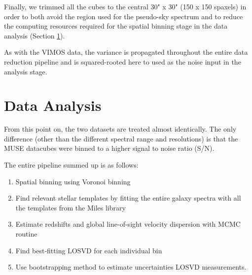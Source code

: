 		Finally, we trimmed all the cubes to the central 30" x 30" (150 x 150 spaxels) in order to both avoid the region used for the pseudo-sky spectrum and to reduce the computing resources required for the spatial binning stage in the data analysis (Section \ref{sec:analysis}). 

		As with the VIMOS data, the variance is propagated throughout the entire data reduction pipeline and is squared-rooted here to used as the noise input in the analysis stage. 
\section{Data Analysis}
	\label{sec:analysis}
	From this point on, the two datasets are treated almost identically. The only difference (other than the different spectral range and resolutions) is that the MUSE datacubes were binned to a higher signal to noise ratio (S/N).



	The entire pipeline summed up is as follows:
	\begin{enumerate}
		\item Spatial binning using Voronoi binning
		\item Find relevant stellar templates by fitting the entire galaxy spectra with all the templates from the Miles library
		\item Estimate redshifts and global line-of-sight velocity dispersion with MCMC routine 
		\item Find best-fitting LOSVD for each individual bin
		\item Use bootstrapping method to estimate uncertainties LOSVD measurements. 
	\end{enumerate}


